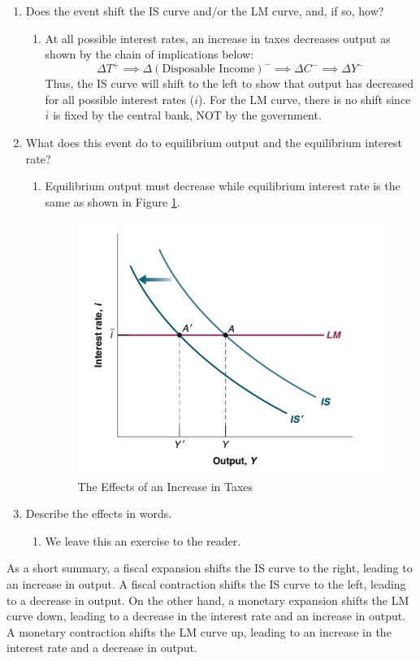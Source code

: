 \documentclass{extarticle}
\begin{document}
\begin{enumerate}
  \item Does the event shift the IS curve and/or the LM curve, and, if so, how?
  \begin{enumerate}
    \item At all possible interest rates, an increase in taxes decreases output as shown by the chain of implications below:
    $$\Delta T^+ \implies \Delta(\text{Disposable Income})^- \implies \Delta C^- \implies \Delta Y^-$$
    Thus, the IS curve will shift to the left to show that output has decreased for all possible interest rates ($i$). For the LM curve, there is no shift since $\overline{i}$ is fixed by the central bank, NOT by the government.
  \end{enumerate}
  \item What does this event do to equilibrium output and the equilibrium interest rate?
  \begin{enumerate}
    \item Equilibrium output must decrease while equilibrium interest rate is the same as shown in Figure \ref{fig:shift}.
  \begin{figure}[h]
    \centering
    \includegraphics[width=0.4\linewidth]{shift-IS.png}
    \caption{The Effects of an Increase in Taxes}
    \label{fig:shift}
  \end{figure}

  \end{enumerate}
  \item Describe the effects in words. 
  \begin{enumerate}
    \item We leave this an exercise to the reader.
  \end{enumerate}
\end{enumerate}

As a short summary, a fiscal expansion shifts the IS curve to the right, leading to an increase in output. A fiscal contraction shifts the IS curve to the left, leading to a decrease in output. On the other hand, a monetary expansion shifts the LM curve down, leading to a decrease in the interest rate and an increase in output. A monetary contraction shifts the LM curve up, leading to an increase in the interest rate and a decrease in output.
\end{document}
